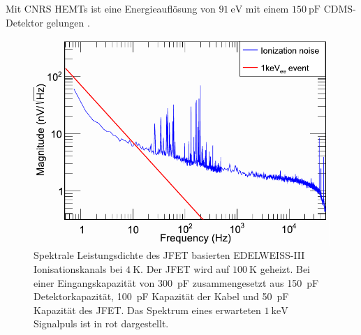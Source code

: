 Mit CNRS HEMTs ist eine Energieauflösung von $\SI{91}{\electronvolt}$ mit einem $\SI{150}{\pico\farad}$ CDMS-Detektor gelungen \cite{Phipps2016}.

\begin{figure}[!b]
\begin{center}
\includegraphics[width=\textwidth]{./fig/Rauschen/EDWIIIPerformance.pdf}
\vspace{-0.5cm}
\caption{Spektrale Leistungsdichte des JFET basierten EDELWEISS-III Ionisationskanals bei $\SI{4}{\kelvin}$.
Der JFET wird auf $\SI{100}{\kelvin}$ geheizt.
Bei einer Eingangskapazität von \SI{300}{\pico\farad} zusammengesetzt aus \SI{150}{\pico\farad} Detektorkapazität, \SI{100}{\pico\farad} Kapazität der Kabel und \SI{50}{\pico\farad} Kapazität des JFET.
Das Spektrum eines erwarteten $\SI{1}{\kilo\electronvolt}$ Signalpuls ist in rot dargestellt.\cite{EDWIII}}
\label{fig:EDWIII}
\end{center}
\end{figure}
